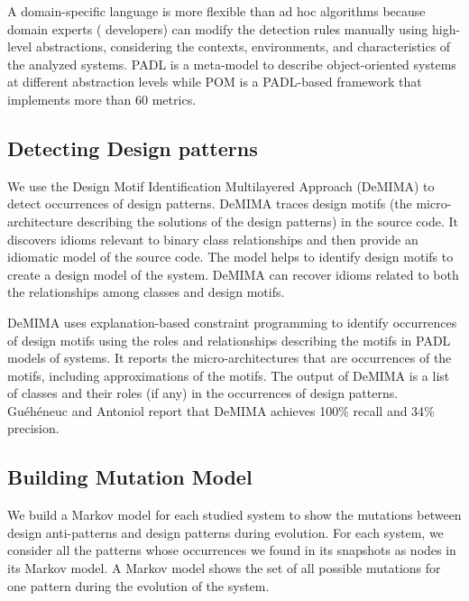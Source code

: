 A domain-specific language is more flexible than ad hoc algorithms \cite{moha2010decor} because domain experts (\ie{} developers) can modify the detection rules manually using high-level abstractions, considering the contexts, environments, and characteristics of the analyzed systems. PADL \cite{gueheneuc2008demima} is a meta-model to describe object-oriented systems at different abstraction levels while POM \cite{gueheneuc2004fingerprinting} is a PADL-based framework that implements more than 60 metrics.



\subsection{Detecting Design patterns}
\label{ssec:section3.2}

We use the Design Motif Identification Multilayered Approach (DeMIMA) \cite{gueheneuc2008demima} to detect occurrences of design patterns. DeMIMA traces design motifs (the micro-architecture describing the solutions of the design patterns) in the source code. It discovers idioms relevant to binary class relationships and then provide an idiomatic model of the source code. The model helps to identify design motifs to create a design model of the system. DeMIMA can recover idioms related to both the relationships among classes and design motifs.

DeMIMA uses explanation-based constraint programming to identify occurrences of design motifs using the roles and relationships describing the motifs in PADL models of systems. It reports the micro-architectures that are occurrences of the motifs, including approximations of the motifs. The output of DeMIMA is a list of classes and their roles (if any) in the  occurrences of design patterns. Gu\'{e}h\'{e}neuc and Antoniol \cite{gueheneuc2008demima} report that DeMIMA achieves 100$\%$ recall and 34$\%$ precision.



\subsection{Building Mutation Model}
\label{ssec:section3.4}

We build a Markov model \cite{meyn2012markov} for each studied system to show the mutations between design anti-patterns and design patterns during evolution. For each system, we consider all the patterns whose occurrences we found in its snapshots as nodes in its Markov model. A Markov model shows the set of all possible mutations for one pattern during the evolution of the system. 

